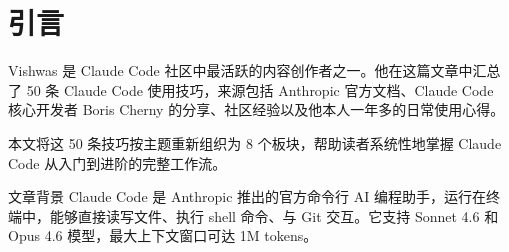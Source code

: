 \section{引言}

Vishwas 是 Claude Code 社区中最活跃的内容创作者之一。他在这篇文章中汇总了 50 条 Claude Code 使用技巧，来源包括 Anthropic 官方文档、Claude Code 核心开发者 Boris Cherny 的分享、社区经验以及他本人一年多的日常使用心得。

本文将这 50 条技巧按主题重新组织为 8 个板块，帮助读者系统性地掌握 Claude Code 从入门到进阶的完整工作流。

\begin{knowledgebox}{文章背景}
Claude Code 是 Anthropic 推出的官方命令行 AI 编程助手，运行在终端中，能够直接读写文件、执行 shell 命令、与 Git 交互。它支持 Sonnet 4.6 和 Opus 4.6 模型，最大上下文窗口可达 1M tokens。
\end{knowledgebox}

